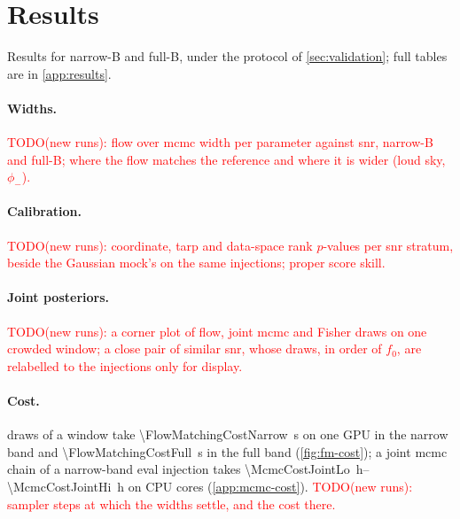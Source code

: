 \section{Results}
\label{sec:results}

Results for narrow-B and full-B, under the protocol of \cref{sec:validation}; full tables are in
\cref{app:results}.

\paragraph{Widths.} \textcolor{red}{TODO(new runs): flow over \acs{mcmc} width per parameter
against \acs{snr}, narrow-B and full-B; where the flow matches the reference and where it is wider
(loud sky, $\phi_-$).}

\paragraph{Calibration.} \textcolor{red}{TODO(new runs): coordinate, \acs{tarp} and data-space
rank $p$-values per \acs{snr} stratum, beside the Gaussian mock's on the same injections; proper
score skill.}

\paragraph{Joint posteriors.} \textcolor{red}{TODO(new runs): a corner plot of flow, joint
\acs{mcmc} and Fisher draws on one crowded window; a close pair of similar
\acs{snr}, whose draws, in order of $f_0$, are relabelled to the injections only for display.}

\paragraph{Cost.} \FlowMatchingCostDraws{} draws of a window take
\qty{\FlowMatchingCostNarrow}{\second} on one GPU in the narrow band and
\qty{\FlowMatchingCostFull}{\second} in the full band (\cref{fig:fm-cost}); a joint \ac{mcmc}
chain of a narrow-band eval injection takes \qtyrange{\McmcCostJointLo}{\McmcCostJointHi}{\hour} on
\McmcJointCores{} CPU cores (\cref{app:mcmc-cost}).
\textcolor{red}{TODO(new runs): sampler steps at which the widths settle, and the cost there.}
